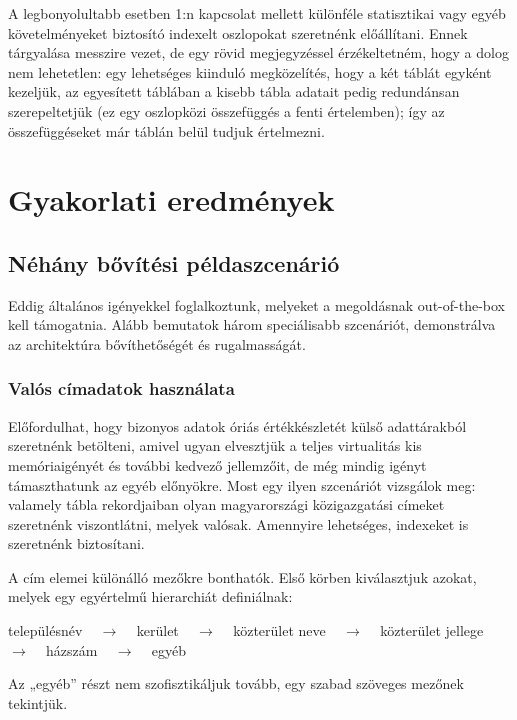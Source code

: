 \documentclass[
    parspace,
    noindent,
    nohyp,
]{elteiktdk}[2023/04/10]
\begin{document}
A legbonyolultabb esetben 1:n kapcsolat mellett különféle statisztikai
vagy egyéb követelményeket biztosító indexelt oszlopokat szeretnénk előállítani.
Ennek tárgyalása messzire vezet,
de egy rövid megjegyzéssel érzékeltetném, hogy a dolog nem lehetetlen:
egy lehetséges kiinduló megközelítés, hogy a két táblát egyként kezeljük,
az egyesített táblában a kisebb tábla adatait pedig redundánsan szerepeltetjük
(ez egy oszlopközi összefüggés a fenti értelemben);
így az összefüggéseket már táblán belül tudjuk értelmezni.



\chapter{Gyakorlati eredmények}

\section{Néhány bővítési példaszcenárió}

Eddig általános igényekkel foglalkoztunk,
melyeket a megoldásnak out-of-the-box kell támogatnia.
Alább bemutatok három speciálisabb szcenáriót,
demonstrálva az architektúra bővíthetőségét és rugalmasságát.

\subsection{Valós címadatok használata}

Előfordulhat, hogy bizonyos adatok óriás értékkészletét külső adattárakból szeretnénk betölteni,
amivel ugyan elvesztjük a teljes virtualitás kis memóriaigényét és további kedvező jellemzőit,
de még mindig igényt támaszthatunk az egyéb előnyökre.
Most egy ilyen szcenáriót vizsgálok meg:
valamely tábla rekordjaiban olyan magyarországi közigazgatási címeket szeretnénk viszontlátni,
melyek valósak.
Amennyire lehetséges, indexeket is szeretnénk biztosítani.

A cím elemei különálló mezőkre bonthatók.
Első körben kiválasztjuk azokat, melyek egy egyértelmű hierarchiát definiálnak:

\begin{center}
    településnév ~ $\rightarrow$ ~
    kerület ~ $\rightarrow$ ~
    közterület neve ~ $\rightarrow$ ~
    közterület jellege ~ $\rightarrow$ ~
    házszám ~ $\rightarrow$ ~
    egyéb
\end{center}

Az „egyéb” részt nem szofisztikáljuk tovább, egy szabad szöveges mezőnek tekintjük.
\end{document}
